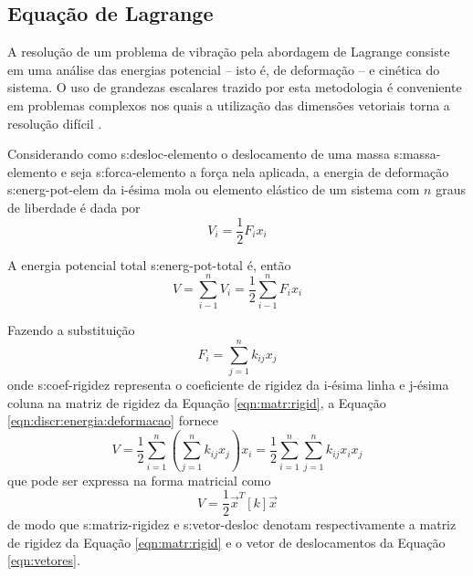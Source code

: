 \documentclass[12pt,openright,oneside,a4paper,
	chapter=TITLE,section=TITLE,
	english,brazil]{abntex2}
\begin{document}
	\subsection{Equação de Lagrange}
	A resolução de um problema de vibração pela abordagem de Lagrange consiste em uma análise das energias potencial -- isto é, de deformação -- e cinética do sistema. O uso de grandezas escalares trazido por esta metodologia é conveniente em problemas complexos nos quais a utilização das dimensões vetoriais torna a resolução difícil \cite{savi:2017}.
	
	Considerando como \gls{s:desloc-elemento} o deslocamento de uma massa \gls{s:massa-elemento} e seja \gls{s:forca-elemento} a força nela aplicada, a energia de deformação \gls{s:energ-pot-elem} da i-ésima mola ou elemento elástico de um sistema com $ n $ graus de liberdade é dada por \cite{rao:2008}
	\begin{equation}
		V_i = \frac{1}{2}F_i x_i
	\end{equation}
	
	A energia potencial total \gls{s:energ-pot-total} é, então
	\begin{equation} \label{eqn:discr:energia:deformacao}
		V = \sum_{i-1}^{n}V_i = \frac{1}{2}\sum_{i-1}^{n}F_i x_i
	\end{equation}
	
	Fazendo a substituição
	\begin{equation}
		F_i = \sum_{j=1}^{n}k_{ij} x_j
	\end{equation}
	onde \gls{s:coef-rigidez} representa o coeficiente de rigidez da i-ésima linha e j-ésima coluna na matriz de rigidez da Equação \ref{eqn:matr:rigid}, a Equação \ref{eqn:discr:energia:deformacao} fornece
	\begin{equation}
		V = \frac{1}{2}\sum_{i=1}^{n}\left(\sum_{j=1}^{n}k_{ij} x_j\right)x_i = \frac{1}{2}\sum_{i=1}^{n}\sum_{j=1}^{n}k_{ij} x_i x_j
	\end{equation}
	que pode ser expressa na forma matricial como
	\begin{equation}
		V = \frac{1}{2}\vec{x}^T [k] \vec{x}
	\end{equation}
	de modo que \gls{s:matriz-rigidez} e \gls{s:vetor-desloc} denotam respectivamente a matriz de rigidez da Equação \ref{eqn:matr:rigid} e o vetor de deslocamentos da Equação \ref{eqn:vetores}.
	
\end{document}
